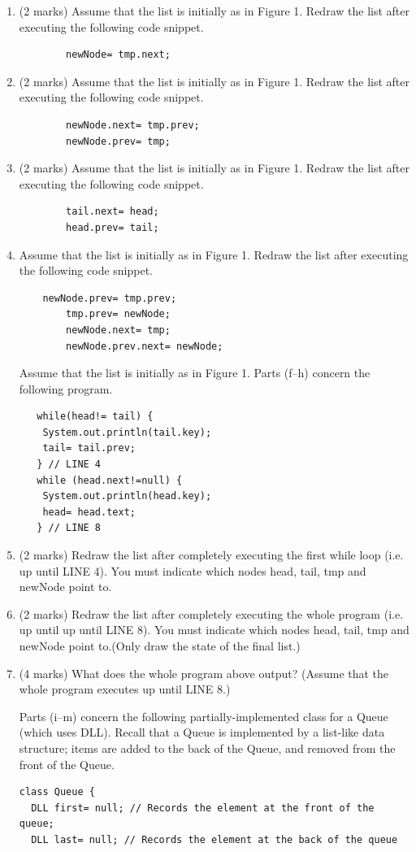 \documentclass[twoside=false,DIV=14]{scrartcl}
\begin{document}
\begin{enumerate}
\item (2 marks) Assume that the list is initially as in Figure 1. Redraw the list after executing the following code snippet.
\begin{lstlisting}
        newNode= tmp.next;
\end{lstlisting}
\item (2 marks) Assume that the list is initially as in Figure 1. Redraw the list after executing the following code snippet.
\begin{lstlisting}
        newNode.next= tmp.prev;
        newNode.prev= tmp;
\end{lstlisting}
\item (2 marks) Assume that the list is initially as in Figure 1. Redraw the list after executing the following code snippet.
\begin{lstlisting}
        tail.next= head;
        head.prev= tail;
\end{lstlisting}
\item Assume that the list is initially as in Figure 1. Redraw the list after executing the following code snippet.
\begin{lstlisting}
    newNode.prev= tmp.prev;
        tmp.prev= newNode;
        newNode.next= tmp;
        newNode.prev.next= newNode;
    \end{lstlisting}
Assume that the list is initially as in Figure 1. Parts (f–h) concern the following program.
\begin{lstlisting}
   while(head!= tail) {
    System.out.println(tail.key);
    tail= tail.prev;
   } // LINE 4
   while (head.next!=null) {
    System.out.println(head.key);
    head= head.text;
   } // LINE 8
\end{lstlisting}
\item (2 marks) Redraw the list after completely executing the first while loop (i.e. up until LINE 4). You must indicate which nodes head, tail, tmp and newNode point to.
\item (2 marks) Redraw the list after completely executing the whole program (i.e. up until up until LINE 8). You must indicate which nodes head, tail, tmp and newNode point to.(Only draw the state of the final list.)
\item (4 marks) What does the whole program above output? (Assume that the whole program executes up until LINE 8.)

Parts (i–m) concern the following partially-implemented class for a Queue (which uses DLL). Recall that a Queue is implemented by a list-like data structure; items are added to the back of the Queue, and removed from the front of the Queue.
{\small\begin{lstlisting}
class Queue {
  DLL first= null; // Records the element at the front of the queue;
  DLL last= null; // Records the element at the back of the queue


\end{lstlisting}}
\end{enumerate}
\end{document}
